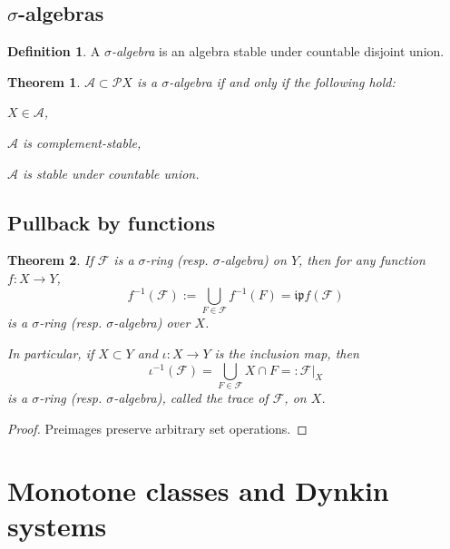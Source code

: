 \documentclass[11pt, a4paper, openany]{book}
\newtheorem{thm}{Theorem}\newtheorem{lem}{Lemma}\newtheorem{crl}{Corollary}
\theoremstyle{definition}
\newtheorem{define}{Definition}\newtheorem{exam}{Example}\newtheorem{remark}{Remark}
\newenvironment{tight_enumerate}{\begin{enumerate}\itemsep -0.2em}{\end{enumerate}}
\begin{document}
\subsection{\texorpdfstring{$\sigma$}{sigma}-algebras}
    \begin{define}\label{definition of sigma algebra}
        A $\sigma$\textit{-algebra} is an algebra stable under countable disjoint union.
    \end{define}
    \begin{thm}\label{sigma algebras}
        $\mathscr{A}\subset\mathscr{P}X$ is a $\sigma$-algebra if and only if the following hold:
        \begin{tight_enumerate}
            \item $X\in \mathscr{A}$,
            \item $\mathscr{A}$ is complement-stable,
            \item $\mathscr{A}$ is stable under countable union.%
        \end{tight_enumerate}
    \end{thm}
\subsection{Pullback by functions}
    \begin{thm}
        If $\mathscr{F}$ is a $\sigma$-ring (resp. $\sigma$-algebra) on $Y$, then for any function $f:X\rightarrow Y$,
        \[
            f^{-1}(\mathscr{F}):=%
            \bigcup_{F\in\mathscr{F}}f^{-1}(F)
            =\mathfrak{i}\mathfrak{p}f(\mathscr{F})
        \]
        is a $\sigma$-ring (resp. $\sigma$-algebra) over $X$.

        In particular, if $X\subset Y$ and $\iota:X\rightarrow Y$ is the inclusion map, then
        \[
            \iota^{-1}(\mathscr{F})=%
            \bigcup_{F\in\mathscr{F}}X\cap F
            =:\mathscr{F}|_X
        \]
        is a $\sigma$-ring (resp. $\sigma$-algebra), called the trace of $\mathscr{F}$, on $X$.
    \end{thm}
    \begin{proof}
        Preimages preserve arbitrary set operations.
    \end{proof}
\section{Monotone classes and Dynkin systems}
\end{document}
